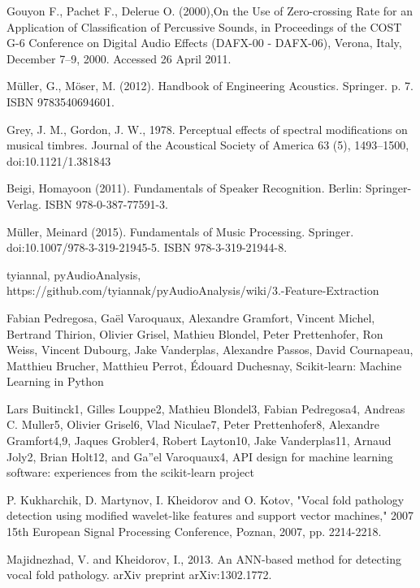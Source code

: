 \documentclass[conference]{IEEEtran}
\begin{document}
\begin{thebibliography}{00}
	
 Gouyon F., Pachet F., Delerue O. (2000),On the Use of Zero-crossing Rate for an Application of Classification of Percussive Sounds, in Proceedings of the COST G-6 Conference on Digital Audio Effects (DAFX-00 - DAFX-06), Verona, Italy, December 7–9, 2000. Accessed 26 April 2011.

Müller, G., Möser, M. (2012). Handbook of Engineering Acoustics. Springer. p. 7. ISBN 9783540694601.

Grey, J. M., Gordon, J. W., 1978. Perceptual effects of spectral modifications on musical timbres. Journal of the Acoustical Society of America 63 (5), 1493–1500, doi:10.1121/1.381843

Beigi, Homayoon (2011). Fundamentals of Speaker Recognition. Berlin: Springer-Verlag. ISBN 978-0-387-77591-3.

Müller, Meinard (2015). Fundamentals of Music Processing. Springer. doi:10.1007/978-3-319-21945-5. ISBN 978-3-319-21944-8.

tyiannal, pyAudioAnalysis, https://github.com/tyiannak/pyAudioAnalysis/wiki/3.-Feature-Extraction

Fabian Pedregosa, Gaël Varoquaux, Alexandre Gramfort, Vincent Michel, Bertrand Thirion, Olivier Grisel, Mathieu Blondel, Peter Prettenhofer, Ron Weiss, Vincent Dubourg, Jake Vanderplas, Alexandre Passos, David Cournapeau, Matthieu Brucher, Matthieu Perrot, Édouard Duchesnay, Scikit-learn: Machine Learning in Python

Lars Buitinck1, Gilles Louppe2, Mathieu Blondel3, Fabian Pedregosa4, Andreas C. Muller5, Olivier Grisel6, Vlad Niculae7, Peter Prettenhofer8, Alexandre Gramfort4,9, Jaques Grobler4, Robert Layton10, Jake Vanderplas11, Arnaud Joly2, Brian Holt12, and Ga''el Varoquaux4, API design for machine learning software: experiences from the scikit-learn project

P. Kukharchik, D. Martynov, I. Kheidorov and O. Kotov, "Vocal fold pathology detection using modified wavelet-like features and support vector machines," 2007 15th European Signal Processing Conference, Poznan, 2007, pp. 2214-2218.

Majidnezhad, V. and Kheidorov, I., 2013. An ANN-based method for detecting vocal fold pathology. arXiv preprint arXiv:1302.1772.

\end{thebibliography}
\end{document}
